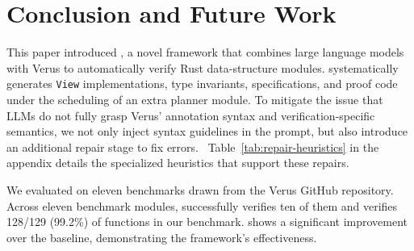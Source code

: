 \section{Conclusion and Future Work}
\label{sec:conclusion}

This paper introduced \toolname{}, a novel framework that combines large language models with Verus to automatically verify Rust data-structure modules. \toolname{} systematically generates \texttt{View} implementations, type invariants, specifications, and proof code under the scheduling of an extra planner module. To mitigate the issue that LLMs do not fully grasp Verus' annotation syntax and verification-specific semantics, we not only inject syntax guidelines in the prompt, but also introduce an additional repair stage to fix errors.%
\ifarxiv
\ Table~\ref{tab:repair-heuristics} in the appendix details the specialized heuristics that support these repairs.
\fi

We evaluated \toolname{} on eleven benchmarks drawn from the Verus GitHub repository. Across eleven benchmark modules, \toolname{} successfully verifies ten of them and verifies 128/129 (99.2\%) of functions in our benchmark. \toolname{} shows a significant improvement over the baseline, demonstrating the framework's effectiveness.








